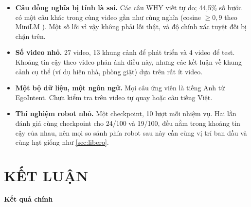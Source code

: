 \documentclass[a4paper,oneside]{report}
\newcommand{\unchapter}[1]{%
  \chapter*{#1}%
  \addcontentsline{toc}{chapter}{#1}}
\newcommand{\mucnho}[1]{\par\vspace{4pt}\noindent\textbf{#1}\par\nobreak}
\begin{document}
\begin{itemize}
  \item \textbf{Câu đồng nghĩa bị tính là sai.} Các câu WHY viết tự do; 44,5\% số bước có một câu khác trong cùng video gần như cùng nghĩa (cosine $\geq 0{,}9$ theo MiniLM \citep{reimers2019sbert}). Một số lỗi vì vậy không phải lỗi thật, và độ chính xác tuyệt đối bị chặn trên.
  \item \textbf{Số video nhỏ.} 27 video, 13 khung cảnh để phát triển và 4 video để test. Khoảng tin cậy theo video phản ánh điều này, nhưng các kết luận về khung cảnh cụ thể (ví dụ hiên nhà, phòng giặt) dựa trên rất ít video.
  \item \textbf{Một bộ dữ liệu, một ngôn ngữ.} Mọi câu ứng viên là tiếng Anh từ EgoIntent. Chưa kiểm tra trên video tự quay hoặc câu tiếng Việt.
  \item \textbf{Thí nghiệm robot nhỏ.} Một checkpoint, 10 lượt mỗi nhiệm vụ. Hai lần đánh giá cùng checkpoint cho 24/100 và 19/100, đều nằm trong khoảng tin cậy của nhau, nên mọi so sánh phía robot sau này cần cùng vị trí ban đầu và cùng hạt giống như \cref{sec:libero}.
\end{itemize}

\unchapter{KẾT LUẬN}
\label{chap:conclusion}

\mucnho{Kết quả chính}
\end{document}
